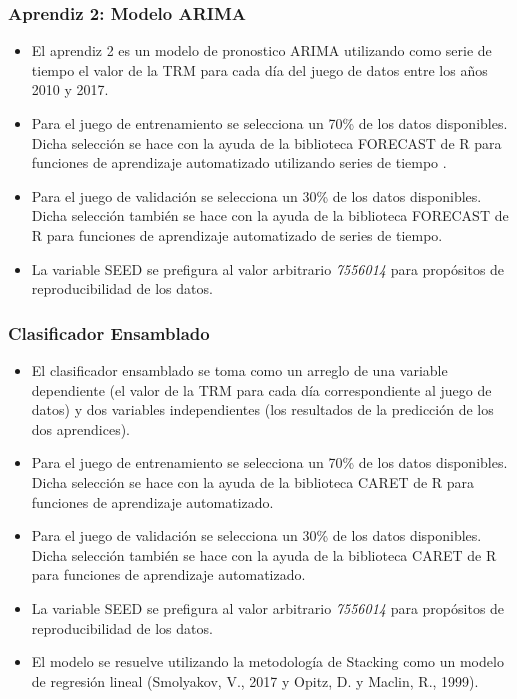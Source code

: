 \begin{spacing}{1.5}
\subsubsection{Aprendiz 2: Modelo ARIMA}
\begin{itemize}
	\item El aprendiz 2 es un modelo de pronostico ARIMA utilizando como serie de tiempo el valor de la TRM para cada día del juego de datos entre los años 2010 y 2017.
	\item Para el juego de entrenamiento se selecciona un 70\% de los datos disponibles. Dicha selección se hace con la ayuda de la biblioteca FORECAST de R para funciones de aprendizaje automatizado utilizando series de tiempo \cite{hyndman}. 
	\item Para el juego de validación se selecciona un 30\% de los datos disponibles. Dicha selección también se hace con la ayuda de la biblioteca FORECAST de R para funciones de aprendizaje automatizado de series de tiempo. 
	\item La variable SEED se prefigura al valor arbitrario \emph{7556014} para propósitos de reproducibilidad de los datos. 
\end{itemize}

\subsubsection{Clasificador Ensamblado}
\begin{itemize}
	\item El clasificador ensamblado se toma como un arreglo de una variable dependiente (el valor de la TRM para cada día correspondiente al juego de datos) y dos variables independientes (los resultados de la predicción de los dos aprendices). 
	\item Para el juego de entrenamiento se selecciona un 70\% de los datos disponibles. Dicha selección se hace con la ayuda de la biblioteca CARET de R para funciones de aprendizaje automatizado. 
	\item Para el juego de validación se selecciona un 30\% de los datos disponibles. Dicha selección también se hace con la ayuda de la biblioteca CARET de R para funciones de aprendizaje automatizado. 
	\item La variable SEED se prefigura al valor arbitrario \emph{7556014} para propósitos de reproducibilidad de los datos. 
	\item El modelo se resuelve utilizando la metodología de Stacking como un modelo de regresión lineal (Smolyakov, V., 2017 y Opitz, D. y Maclin, R., 1999).
\end{itemize}


\end{spacing}
